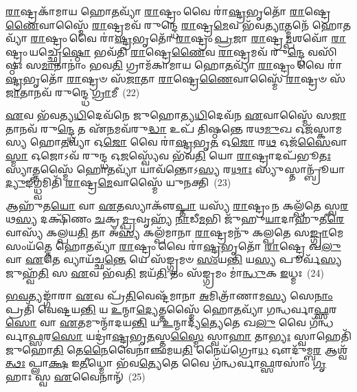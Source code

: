 {\anuvakamend[{𑌮𑌨𑍋᳴\-𑌽𑌮𑍃\-\ul{𑌡}\-𑌯𑌃 𑌷𑌟𑍍𑌚᳴𑌤𑍍𑌵𑌾𑌰𑌿𑍞𑌶𑌚𑍍𑌚}]}%

\-\ul{𑌰𑌾}\-𑌷𑍍𑌟𑍍𑌰𑌕𑌾᳴𑌮𑌾𑌯 𑌹𑍋\-\ul{𑌤}\-𑌵𑍍𑌯𑌾᳴ \ul{𑌰𑌾}\-𑌷𑍍𑌟𑍍𑌰𑌂 𑌵𑍈 𑌰𑌾॑\-\ul{𑌷𑍍𑌟𑍍𑌰}\-𑌭𑍃𑌤𑍋᳴ \ul{𑌰𑌾}\-𑌷𑍍𑌟𑍍𑌰𑍇\-\ul{𑌣𑍈}\-𑌵𑌾𑌸𑍍𑌮𑍈᳴ \ul{𑌰𑌾}\-𑌷𑍍𑌟𑍍𑌰𑌮𑌵᳴ 𑌰𑍁𑌨𑍍𑌦𑍍𑌧𑍇 \ul{𑌰𑌾}\-𑌷𑍍𑌟𑍍𑌰\-\ul{𑌮𑍇}\-𑌵 𑌭᳴𑌵\-\ul{𑌤𑍍𑌯𑌾}\-𑌤𑍍𑌮𑌨𑍇᳴ 𑌹𑍋\-\ul{𑌤}\-𑌵𑍍𑌯𑌾᳴ \ul{𑌰𑌾}\-𑌷𑍍𑌟𑍍𑌰𑌂 𑌵𑍈 𑌰𑌾॑\-\ul{𑌷𑍍𑌟𑍍𑌰}\-𑌭𑍃𑌤𑍋᳴ \ul{𑌰𑌾}\-𑌷𑍍𑌟𑍍𑌰𑌂 \ul{𑌪𑍍𑌰}\-𑌜𑌾 \ul{𑌰𑌾}\-𑌷𑍍𑌟𑍍𑌰\-\ul{𑌮𑍍𑌪}\-𑌶𑌵𑍋᳴ \ul{𑌰𑌾}\-𑌷𑍍𑌟𑍍𑌰𑌂 𑌯𑌚𑍍𑌛𑍍𑌰𑍇\-\ul{𑌷𑍍𑌠𑍋} 𑌭𑌵᳴𑌤𑌿 \ul{𑌰𑌾}\-𑌷𑍍𑌟𑍍𑌰𑍇\-\ul{𑌣𑍈}\-𑌵 \ul{𑌰𑌾}\-𑌷𑍍𑌟𑍍𑌰𑌮𑌵᳴ 𑌰𑍁\-\ul{𑌨𑍍𑌦𑍍𑌧𑍇} 𑌵𑌸𑌿᳴𑌷𑍍𑌠𑌃 𑌸\-\ul{𑌮𑌾}\-𑌨𑌾𑌨𑌾𑌂॑ 𑌭𑌵\-\ul{𑌤𑌿} 𑌗𑍍𑌰𑌾𑌮᳴𑌕𑌾𑌮𑌾𑌯 𑌹𑍋\-\ul{𑌤}\-𑌵𑍍𑌯𑌾᳴ \ul{𑌰𑌾}\-𑌷𑍍𑌟𑍍𑌰𑌂 𑌵𑍈 𑌰𑌾॑\-\ul{𑌷𑍍𑌟𑍍𑌰}\-𑌭𑍃𑌤𑍋᳴ \ul{𑌰𑌾}\-𑌷𑍍𑌟𑍍𑌰𑍞 𑌸᳴\-\ul{𑌜𑌾}\-𑌤𑌾 \ul{𑌰𑌾}\-𑌷𑍍𑌟𑍍𑌰𑍇\-\ul{𑌣𑍈}\-𑌵𑌾𑌸𑍍𑌮𑍈᳴ \ul{𑌰𑌾}\-𑌷𑍍𑌟𑍍𑌰𑍞 𑌸᳴\-\ul{𑌜𑌾}\-𑌤𑌾𑌨𑌵᳴ 𑌰𑍁𑌨𑍍𑌦𑍍𑌧𑍇 \ul{𑌗𑍍𑌰𑌾}\-𑌮𑍀~(22)

\-\ul{𑌏}\-𑌵 𑌭᳴𑌵𑌤𑍍𑌯\-\ul{𑌧𑌿}\-𑌦𑍇𑌵᳴𑌨𑍇 𑌜𑍁𑌹𑍋𑌤𑍍𑌯\-\ul{𑌧𑌿}\-𑌦𑍇𑌵᳴𑌨 \ul{𑌏}\-𑌵𑌾𑌸𑍍𑌮𑍈᳴ 𑌸\-\ul{𑌜𑌾}\-𑌤𑌾𑌨𑌵᳴ 𑌰𑍁\-\ul{𑌨𑍍𑌦𑍍𑌧𑍇} 𑌤 𑌏᳴\-\ul{𑌨}\-𑌮𑌵᳴𑌰𑍁\-\ul{𑌦𑍍𑌧𑌾} 𑌉𑌪᳴ 𑌤𑌿𑌷𑍍𑌠𑌨𑍍𑌤𑍇 𑌰𑌥\-\ul{𑌮𑍁}\-𑌖 𑌓𑌜᳴𑌸𑍍𑌕𑌾𑌮𑌸𑍍𑌯 𑌹𑍋\-\ul{𑌤}\-𑌵𑍍𑌯𑌾᳴ 𑌓\-\ul{𑌜𑍋} 𑌵𑍈 𑌰𑌾॑\-\ul{𑌷𑍍𑌟𑍍𑌰}\-𑌭𑍃\-\ul{𑌤} 𑌓\-\ul{𑌜𑍋} 𑌰\-\ul{𑌥} 𑌓𑌜᳴\-\ul{𑌸𑍈}\-𑌵𑌾\-\ul{𑌸𑍍𑌮𑌾} 𑌓𑌜𑍋\-𑌽𑌵᳴ 𑌰𑍁𑌨𑍍𑌦𑍍𑌧 𑌓\-\ul{𑌜}\-𑌸𑍍𑌵𑍍𑌯𑍇᳴𑌵 𑌭᳴𑌵\-\ul{𑌤𑌿} 𑌯𑍋 \ul{𑌰𑌾}\-𑌷𑍍𑌟𑍍𑌰𑌾𑌦𑌪᳴𑌭𑍂\-\ul{𑌤𑌃} 𑌸𑍍𑌯𑌾𑌤𑍍𑌤𑌸𑍍𑌮𑍈᳴ 𑌹𑍋\-\ul{𑌤}\-𑌵𑍍𑌯𑌾᳴ 𑌯𑌾𑌵᳴𑌨𑍍𑌤𑍋\-𑌽\-\ul{𑌸𑍍𑌯} 𑌰\-\ul{𑌥𑌾𑌃} 𑌸𑍍𑌯𑍁𑌸𑍍𑌤𑌾𑌨𑍍𑌬𑍍𑌰𑍂᳴𑌯𑌾\-\ul{𑌦𑍍𑌯𑍁}\-𑌙𑍍𑌗𑍍𑌧𑍍𑌵𑌮𑌿𑌤𑌿᳴ \ul{𑌰𑌾}\-𑌷𑍍𑌟𑍍𑌰\-\ul{𑌮𑍇}\-𑌵𑌾𑌸𑍍𑌮𑍈᳴ 𑌯𑍁𑌨𑌕𑍍𑌤𑌿~(23)

𑌆𑌹𑍁᳴𑌤\-\ul{𑌯𑍋} 𑌵𑌾 \ul{𑌏}\-𑌤𑌸𑍍𑌯𑌾𑌕𑍢᳴\-\ul{𑌪𑍍𑌤𑌾} 𑌯𑌸𑍍𑌯᳴ \ul{𑌰𑌾}\-𑌷𑍍𑌟𑍍𑌰𑌂 𑌨 𑌕𑌲𑍍𑌪᳴𑌤𑍇 𑌸𑍍𑌵\-\ul{𑌰}\-𑌥\-\ul{𑌸𑍍𑌯} 𑌦𑌕𑍍𑌷𑌿᳴𑌣𑌂 \ul{𑌚}\-𑌕𑍍𑌰\-\ul{𑌮𑍍𑌪𑍍𑌰}\-𑌵𑍃𑌹𑍍𑌯᳴ \ul{𑌨𑌾}\-𑌡𑍀\-\ul{𑌮}\-𑌭𑌿 𑌜𑍁᳴𑌹𑍁\-\ul{𑌯𑌾}\-𑌦𑌾𑌹𑍁᳴𑌤𑍀\-\ul{𑌰𑍇}\-𑌵𑌾𑌸𑍍𑌯᳴ 𑌕𑌲𑍍𑌪𑌯\-\ul{𑌤𑌿} 𑌤𑌾 𑌅᳴\-\ul{𑌸𑍍𑌯} 𑌕𑌲𑍍𑌪᳴𑌮𑌾𑌨𑌾 \ul{𑌰𑌾}\-𑌷𑍍𑌟𑍍𑌰𑌮𑌨𑍁᳴ 𑌕𑌲𑍍𑌪𑌤𑍇 𑌸\-\ul{𑌙𑍍𑌗𑍍𑌰𑌾}\-𑌮𑍇 𑌸𑌂𑌯᳴𑌤𑍍𑌤𑍇 𑌹𑍋\-\ul{𑌤}\-𑌵𑍍𑌯𑌾᳴ \ul{𑌰𑌾}\-𑌷𑍍𑌟𑍍𑌰𑌂 𑌵𑍈 𑌰𑌾॑\-\ul{𑌷𑍍𑌟𑍍𑌰}\-𑌭𑍃𑌤𑍋᳴ \ul{𑌰𑌾}\-𑌷𑍍𑌟𑍍𑌰𑍇 𑌖\-\ul{𑌲𑍁} 𑌵𑌾 \ul{𑌏}\-𑌤𑍇 𑌵𑍍𑌯𑌾𑌯᳴𑌚𑍍𑌛\-\ul{𑌨𑍍𑌤𑍇} 𑌯𑍇 𑌸᳴𑌙𑍍𑌗𑍍𑌰𑌮𑍞 \ul{𑌸𑌂}\-𑌯\-\ul{𑌨𑍍𑌤𑌿} 𑌯\-\ul{𑌸𑍍𑌯} 𑌪𑍂𑌰𑍍𑌵᳴\-\ul{𑌸𑍍𑌯} 𑌜𑍁𑌹𑍍𑌵᳴\-\ul{𑌤𑌿} 𑌸 \ul{𑌏}\-𑌵 𑌭᳴𑌵\-\ul{𑌤𑌿} 𑌜𑌯᳴\-\ul{𑌤𑌿} 𑌤𑌂 𑌸᳴𑌙𑍍𑌗𑍍𑌰𑌮𑌂 𑌮𑌾॑\-\ul{𑌨𑍍𑌧𑍁}\-𑌕 \ul{𑌇}\-𑌧𑍍𑌮𑌃~(24)

\-\ul{𑌭}\-\-\ul{𑌵}\-𑌤𑍍𑌯𑌙𑍍𑌗𑌾᳴𑌰𑌾 \ul{𑌏}\-𑌵 𑌪𑍍𑌰᳴\-\ul{𑌤𑌿}\-𑌵𑍇𑌷𑍍𑌟᳴𑌮𑌾𑌨𑌾 \ul{𑌅}\-𑌮𑌿𑌤𑍍𑌰𑌾᳴𑌣𑌾𑌮\-\ul{𑌸𑍍𑌯} 𑌸𑍇\-\ul{𑌨𑌾𑌂} 𑌪𑍍𑌰𑌤𑌿᳴ 𑌵𑍇𑌷𑍍𑌟𑌯\-\ul{𑌨𑍍𑌤𑌿} 𑌯 \ul{𑌉}\-𑌨𑍍𑌮𑌾\-\ul{𑌦𑍍𑌯𑍇}\-𑌤𑍍𑌤𑌸𑍍𑌮𑍈᳴ 𑌹𑍋\-\ul{𑌤}\-𑌵𑍍𑌯𑌾᳴ 𑌗𑌨𑍍𑌧𑌰𑍍𑌵𑌾\-\ul{𑌫𑍍𑌸}\-𑌰\-\ul{𑌸𑍋} 𑌵𑌾 \ul{𑌏}\-𑌤𑌮𑍁𑌨𑍍𑌮𑌾᳴𑌦𑌯\-\ul{𑌨𑍍𑌤𑌿} 𑌯 \ul{𑌉}\-𑌨𑍍𑌮𑌾𑌦𑍍𑌯᳴\-\ul{𑌤𑍍𑌯𑍇}\-𑌤𑍇 𑌖\-\ul{𑌲𑍁} 𑌵𑍈 𑌗᳴𑌨𑍍𑌧𑌰𑍍𑌵𑌾\-\ul{𑌫𑍍𑌸}\-𑌰\-\ul{𑌸𑍋} 𑌯𑌦𑍍𑌰𑌾॑\-\ul{𑌷𑍍𑌟𑍍𑌰}\-𑌭𑍃\-\ul{𑌤}\-𑌸𑍍𑌤\-\ul{𑌸𑍍𑌮𑍈} 𑌸𑍍𑌵𑌾\-\ul{𑌹𑌾} 𑌤𑌾\-\ul{𑌭𑍍𑌯𑌃} 𑌸𑍍𑌵𑌾𑌹𑍇𑌤𑌿᳴ 𑌜𑍁𑌹𑍋\-\ul{𑌤𑌿} 𑌤𑍇\-\ul{𑌨𑍈}\-𑌵𑍈𑌨𑌾॑𑌞𑍍𑌛𑌮𑌯\-\ul{𑌤𑌿} 𑌨𑍈𑌯᳴𑌗𑍍𑌰𑍋\-\ul{𑌧} 𑌔𑌦𑍁᳴𑌮𑍍𑌬\-\ul{𑌰} 𑌆𑌶𑍍𑌵᳴\-\ul{𑌤𑍍𑌥𑌃} 𑌪𑍍𑌲𑌾\-\ul{𑌕𑍍𑌷} 𑌇\-\ul{𑌤𑍀}\-𑌧𑍍𑌮𑍋 𑌭᳴𑌵\-\ul{𑌤𑍍𑌯𑍇}\-𑌤𑍇 𑌵𑍈 𑌗᳴𑌨𑍍𑌧𑌰𑍍𑌵𑌾\-\ul{𑌫𑍍𑌸}\-𑌰𑌸𑌾𑌂॑ \ul{𑌗𑍃}\-𑌹𑌾𑌃 𑌸𑍍𑌵 \ul{𑌏}\-𑌵𑍈𑌨𑌾𑌨𑍍᳴~(25)

